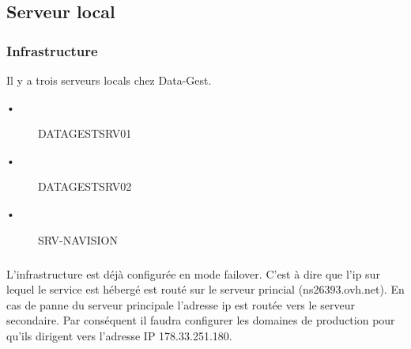 \subsection{Serveur local}


\subsubsection{Infrastructure}
Il y a trois serveurs locals chez Data-Gest. 
\begin{description}
\item[•]DATAGESTSRV01
\item[•]DATAGESTSRV02
\item[•]SRV-NAVISION
\end{description}


\subparagraph{}
L'infrastructure est déjà configurée en mode failover. C'est à dire que l'ip sur lequel le service est hébergé est routé sur le
serveur princial (ns26393.ovh.net). En cas de panne du serveur principale l'adresse ip est routée vers le serveur
secondaire. Par conséquent il faudra configurer les domaines de production pour qu'ils dirigent vers l'adresse IP
178.33.251.180.




%
%
%
%
%


